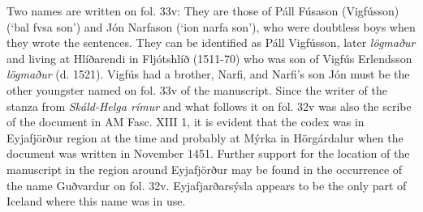 \documentclass[11pt,twoside]{article}\makeatletter
\def\ref{}
\begin{document}
Two names are written on fol. 33v: They are those of Páll Fúsason (Vigfússon) (‘bal fvsa son’) and Jón Narfason (‘ion narfa son’), who were doubtless boys when they wrote the sentences. They can be identified as Páll Vigfússon, later \textit{lögmaður} and living at Hlíðarendi in Fljótshlíð (1511-70) who was son of Vigfús Erlendsson \textit{lögmaður} (d. 1521). Vigfús had a brother, Narfi, and Narfi’s son Jón must be the other youngster named on fol. 33v of the manuscript. Since the writer of the stanza from \textit{Skáld-Helga rímur} and what follows it on fol. 32v was also the scribe of the document in {\ref AM Fasc. XIII 1}, it is evident that the codex was in Eyjafjörður region at the time and probably at Mýrka in Hörgárdalur when the document was written in November 1451. Further support for the location of the manuscript in the region around Eyjafjörður may be found in the occurrence of the name Guðvardur on fol. 32v. Eyjafjarðarsýsla appears to be the only part of Iceland where this name was in use.
\end{document}
